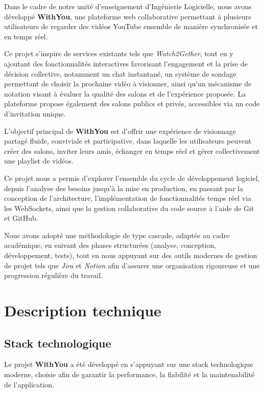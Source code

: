 \documentclass[12pt,a4paper]{report}
\begin{document}
Dans le cadre de notre unité d’enseignement d’Ingénierie Logicielle, nous avons développé \textbf{WithYou}, une plateforme web collaborative permettant à plusieurs utilisateurs de regarder des vidéos YouTube ensemble de manière synchronisée et en temps réel.

Ce projet s’inspire de services existants tels que \textit{Watch2Gether}, tout en y ajoutant des fonctionnalités interactives favorisant l’engagement et la prise de décision collective, notamment un chat instantané, un système de sondage permettant de choisir la prochaine vidéo à visionner, ainsi qu’un mécanisme de notation visant à évaluer la qualité des salons et de l’expérience proposée. La plateforme propose également des salons publics et privés, accessibles via un code d’invitation unique.

L’objectif principal de \textbf{WithYou} est d’offrir une expérience de visionnage partagé fluide, conviviale et participative, dans laquelle les utilisateurs peuvent créer des salons, inviter leurs amis, échanger en temps réel et gérer collectivement une playlist de vidéos.

Ce projet nous a permis d’explorer l’ensemble du cycle de développement logiciel, depuis l’analyse des besoins jusqu’à la mise en production, en passant par la conception de l’architecture, l’implémentation de fonctionnalités temps réel via les WebSockets, ainsi que la gestion collaborative du code source à l’aide de Git et GitHub.

Nous avons adopté une méthodologie de type cascade, adaptée au cadre académique, en suivant des phases structurées (analyse, conception, développement, tests), tout en nous appuyant sur des outils modernes de gestion de projet tels que \textit{Jira} et \textit{Notion} afin d’assurer une organisation rigoureuse et une progression régulière du travail.
\chapter{Description technique}

\section{Stack technologique}

Le projet \textbf{WithYou} a été développé en s’appuyant sur une stack technologique moderne, choisie afin de garantir la performance, la fiabilité et la maintenabilité de l’application.
\end{document}
